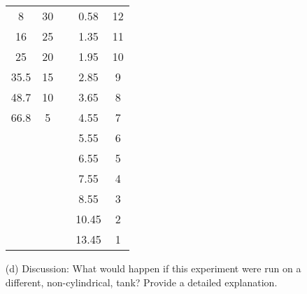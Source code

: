 \begin{lab}
\begin{enumerate}
\begin{center}
\begin{tabular}{|c|c|c|c|c|}
                    8      & 30  & &  0.58  &  12\\
                    16     & 25  & &  1.35  &  11\\
                    25     & 20  & &  1.95  &  10\\
                    35.5   & 15  & &  2.85  &  9\\
                    48.7   & 10  & &  3.65  &  8\\
                    66.8   & 5   & &  4.55  &  7\\
                    &     & &  5.55  &  6\\
                    &     & &  6.55  &  5\\
                    &     & &  7.55  &  4\\
                    &     & &  8.55  &  3\\
                    &     & &  10.45 &  2\\
                    &     & &  13.45 &  1\\\hline
                \end{tabular}
            \end{center}
        \item[(d)] Discussion: What would happen if this experiment were run on a different,
            non-cylindrical, tank? Provide a detailed explanation.
    \end{enumerate}
\end{lab}

